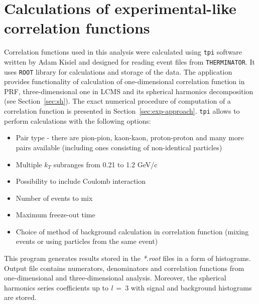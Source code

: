   \section{Calculations of experimental-like correlation functions}
    Correlation functions used in this analysis were calculated using \verb|tpi| software written by Adam Kisiel and designed for reading event files from \verb|THERMINATOR|.
    It uses \verb|ROOT| library for calculations and storage of the data.
    The application provides functionality of calculation of one-dimensional correlation function in PRF, three-dimensional one in LCMS and its spherical harmonics decomposition (see Section~\ref{sec:sh}).
    The exact numerical procedure of computation of a correlation function is presented in Section~\ref{sec:exp-approach}.
    \verb|tpi| allows to perform calculations with the following options:
    \begin{itemize}
      \item Pair type - there are pion-pion, kaon-kaon, proton-proton and many more pairs available (including ones consisting of non-identical particles)
      \item Multiple $k_T$ subranges from 0.21 to 1.2 GeV/c
      \item Possibility to include Coulomb interaction
      \item Number of events to mix
      \item Maximum freeze-out time
      \item Choice of method of background calculation in correlation function (mixing events or using particles from the same event)
    \end{itemize}
    This program generates results stored in the \textit{*.root} files in a form of histograms.
    Output file contains numerators, denominators and correlation functions from one-dimensional and three-dimensional analysis.
    Moreover, the spherical harmonics series coefficients up to \textit{l}~=~3 with signal and background histograms are stored.
